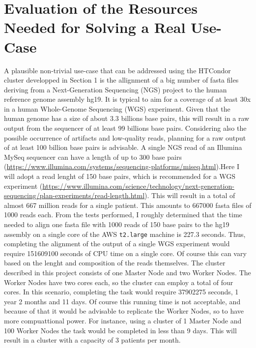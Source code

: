 \documentclass{article}
\begin{document}
\section{Evaluation of the Resources Needed for Solving a Real Use-Case}
A plausible non-trivial use-case that can be addressed using the HTCondor cluster developped in Section 1 is the allignment of a big number of fasta files deriving from a Next-Generation Sequencing (NGS) project to the human reference genome assembly hg19.
It is typical to aim for a coverage of at least 30x in a human Whole-Genome Sequencing (WGS) experiment.
Given that the human genome has a size of about 3.3 billions base pairs, this will result in a raw output from the sequencer of at least 99 billions base pairs.
Considering also the possible occurrence of artifacts and low-quality reads, planning for a raw output of at least 100 billion base pairs is advisable.
A single NGS read of an Illumina MySeq sequencer can have a length of up to 300 base pairs (\url{https://www.illumina.com/systems/sequencing-platforms/miseq.html}).Here I will adopt a read lenght of 150 base pairs, which is recommended for a WGS experiment (\url{https://www.illumina.com/science/technology/next-generation-sequencing/plan-experiments/read-length.html}).
This will result in a total of almost 667 million reads for a single patient.
This amounts to 667000 fasta files of 1000 reads each.
From the tests performed, I roughly determined that the time needed to align one fasta file with 1000 reads of 150 base pairs to the hg19 assembly on a single core of the AWS \texttt{t2.large} machine is 227.3 seconds.
Thus, completing the alignment of the output of a single WGS experiment would require 151609100 seconds of CPU time on a single core.
Of course this can vary based on the lenght and composition of the reads themselves.
The cluster described in this project consists of one Master Node and two Worker Nodes.
The Worker Nodes have two cores each, so the cluster can employ a total of four cores.
In this scenario, completing the task would require 37902275 seconds, 1 year 2 months and 11 days.
Of course this running time is not acceptable, and because of that it would be advisable to replicate the Worker Nodes, so to have more compuattional power.
For instance, using a cluster of 1 Master Node and 100 Worker Nodes the task would be completed in less than 9 days.
This will result in a cluster with a capacity of 3 patients per month.
\end{document}
